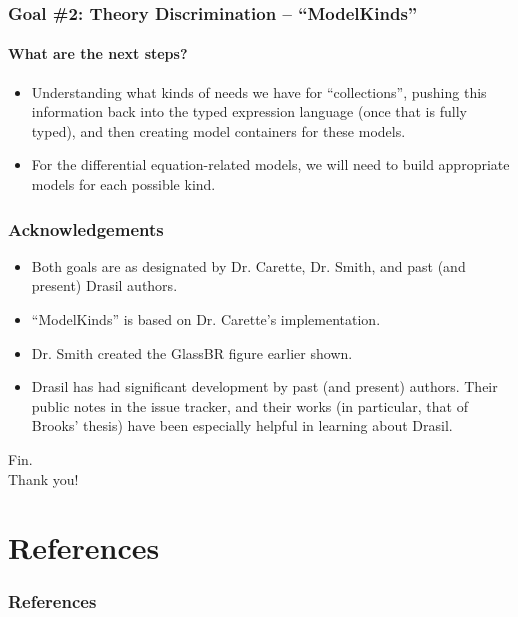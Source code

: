 \documentclass{beamer}
\begin{document}
\begin{frame}
    \frametitle{Goal \#2: Theory Discrimination -- ``ModelKinds''}
    \framesubtitle{What are the next steps?}
    
    \begin{itemize}
        \item<2-> Understanding what kinds of needs we have for ``collections'', pushing this information back into the typed expression language (once that is fully typed), and then creating model containers for these models.
        \item<3-> For the differential equation-related models, we will need to build appropriate models for each possible kind.
    \end{itemize}
\end{frame}


\begin{frame}
    \frametitle{Acknowledgements}

    \begin{itemize}
        \item<2-> Both goals are as designated by Dr. Carette, Dr. Smith, and past (and present) Drasil authors.
        \item<3-> ``ModelKinds'' is based on Dr. Carette's implementation.
        \item<4-> Dr. Smith created the GlassBR figure earlier shown.
        \item<5-> Drasil has had significant development by past (and present) authors. Their public notes in the issue tracker, and their works (in particular, that of Brooks' thesis) have been especially helpful in learning about Drasil.
    \end{itemize}
\end{frame}


\begin{frame}
    \center
    \huge{Fin.}\\
    \normalsize{Thank you!}
\end{frame}


\section{References}

\begin{frame}[allowframebreaks]
    \frametitle{References}

    
    
\end{frame}
\end{document}
